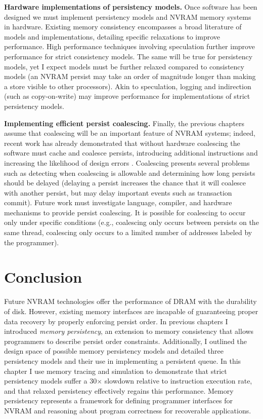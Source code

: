 \textbf{Hardware implementations of persistency models.}
Once software has been designed we must implement persistency models and NVRAM memory systems in hardware.
Existing memory consistency encompasses a broad literature of models and implementations, detailing specific relaxations to improve performance.
High performance techniques involving speculation further improve performance for strict consistency models.
The same will be true for persistency models, yet I expect models must be further relaxed compared to consistency models (an NVRAM persist may take an order of magnitude longer than making a store visible to other processors).
Akin to speculation, logging and indirection (such as copy-on-write) may improve performance for implementations of strict persistency models.

\textbf{Implementing efficient persist coalescing.}
Finally, the previous chapters assume that coalescing will be an important feature of NVRAM systems; indeed, recent work has already demonstrated that without hardware coalescing the software must cache and coalesce persists, introducing additional instructions and increasing the likelihood of design errors \cite{ConditNightingale09,FangHsiao11}.
Coalescing presents several problems such as detecting when coalescing is allowable and determining how long persists should be delayed (delaying a persist increases the chance that it will coalesce with another persist, but may delay important events such as transaction commit).
Future work must investigate language, compiler, and hardware mechanisms to provide persist coalescing.
It is possible for coalescing to occur only under specific conditions (e.g., coalescing only occurs between persists on the same thread, coalescing only occurs to a limited number of addresses labeled by the programmer).

\section{Conclusion}
\label{sec:PersistencyEval:Conclusion}

Future NVRAM technologies offer the performance of DRAM with the durability of disk.
However, existing memory interfaces are incapable of guaranteeing proper data recovery by properly enforcing persist order.
In previous chapters I introduced \emph{memory persistency}, an extension to memory consistency that allows programmers to describe persist order constraints.
Additionally, I outlined the design space of possible memory persistency models and detailed three persistency models and their use in implementing a persistent queue.
In this chapter I use memory tracing and simulation to demonstrate that strict persistency models suffer a 30$\times$ slowdown relative to instruction execution rate, and that relaxed persistency effectively regains this performance.
Memory persistency represents a framework for defining programmer interfaces for NVRAM and reasoning about program correctness for recoverable applications.
